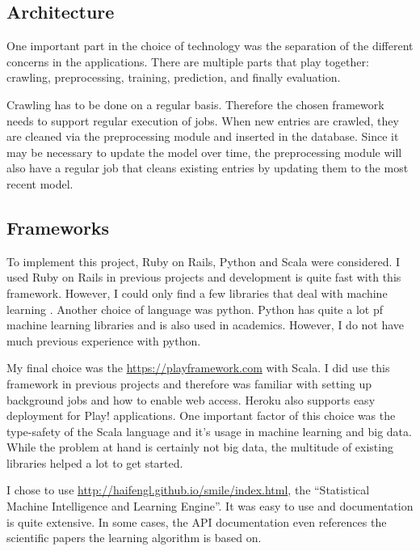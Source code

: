 \subsection{Architecture}\label{sec:architecture}
One important part in the choice of technology was the separation of the different concerns in the applications. There are multiple parts that play together: crawling, preprocessing, training, prediction, and finally evaluation. 

Crawling has to be done on a regular basis. Therefore the chosen framework needs to support regular execution of jobs. When new entries are crawled, they are cleaned via the preprocessing module and inserted in the database. Since it may be necessary to update the model over time, the preprocessing module will also have a regular job that cleans existing entries by updating them to the most recent model.



\subsection{Frameworks}\label{sec:frameworks}
To implement this project, Ruby on Rails, Python and Scala were considered. I used Ruby on Rails in previous projects and development is quite fast with this framework. However, I could only find a few libraries that deal with machine learning \cite{bigml} \cite{leanpanda}. 
Another choice of language was python. Python has quite a lot pf machine learning libraries and is also used in academics. However, I do not have much previous experience with python.

My final choice was the \href{Play! framework}{https://playframework.com} with Scala. I did use this framework in previous projects and therefore was familiar with setting up background jobs and how to enable web access. Heroku also supports easy deployment for Play! applications. One important factor of this choice was the type-safety of the Scala language and it's usage in machine learning and big data. While the problem at hand is certainly not big data, the multitude of existing libraries helped a lot to get started.

I chose to use \href{Smile}{http://haifengl.github.io/smile/index.html}, the ``Statistical Machine Intelligence and Learning Engine''. It was easy to use and documentation is quite extensive. In some cases, the API documentation even references the scientific papers the learning algorithm is based on. 


